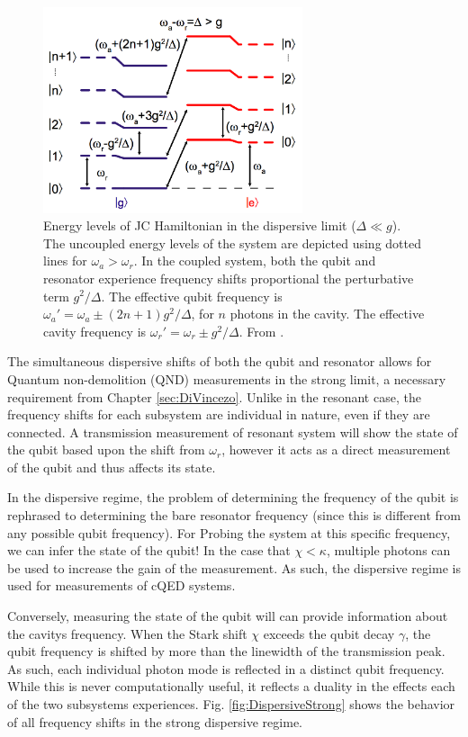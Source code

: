 \documentclass[11 pt, oneside]{book} %
\begin{document}
\begin{figure}[h] 
   \centering
   \includegraphics[width=3in]{SchusterDispersiveEnergyLevels.png} 
   \caption[Energy levels of JC Hamiltonian in the dispersive limit]{Energy levels of JC Hamiltonian in the dispersive limit ($\Delta\ll g$). The uncoupled energy levels of the system are depicted using dotted lines for $\omega_a > \omega_r$. In the coupled system, both the qubit and resonator experience frequency shifts proportional the perturbative term $g^2/\Delta$. The effective qubit frequency is $\omega_a'=\omega_a\pm(2n+1)g^2/\Delta$, for $n$ photons in the cavity. The effective cavity frequency is $\omega_r'=\omega_r\pm g^2/\Delta$. From \cite{Schuster}.}
   \label{fig:DispersiveEnergyLevels}
\end{figure}

The simultaneous dispersive shifts of both the qubit and resonator allows for Quantum non-demolition (QND) measurements in the strong limit, a necessary requirement from Chapter \ref{sec:DiVincezo}. Unlike in the resonant case, the frequency shifts for each subsystem are individual in nature, even if they are connected. A transmission measurement of resonant system will show the state of the qubit based upon the shift from $\omega_r$, however it acts as a direct measurement of the qubit and thus affects its state.

In the dispersive regime, the problem of determining the frequency of the qubit is rephrased to determining the bare resonator frequency (since this is different from any possible qubit frequency). For  Probing the system at this specific frequency, we can infer the state of the qubit! In the case that $\chi<\kappa$, multiple photons can be used to increase the gain of the measurement. As such, the dispersive regime is used for measurements of cQED systems. 

Conversely, measuring the state of the qubit will can provide information about the cavitys frequency. When the Stark shift $\chi$ exceeds the qubit decay $\gamma$, the qubit frequency is shifted by more than the linewidth of the transmission peak. As such, each individual photon mode is reflected in a distinct qubit frequency. While this is never computationally useful, it reflects a duality in the effects each of the two subsystems experiences. Fig. \ref{fig:DispersiveStrong} shows the behavior of all frequency shifts in the strong dispersive regime. 
\end{document}
